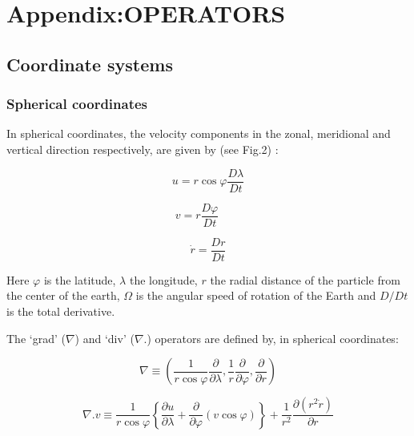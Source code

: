 
\section{Appendix:OPERATORS}

\subsection{Coordinate systems}

\subsubsection{Spherical coordinates}

In spherical coordinates, the velocity components in the zonal, meridional
and vertical direction respectively, are given by (see Fig.2) :

\begin{equation*}
u=r\cos \varphi \frac{D\lambda }{Dt}
\end{equation*}

\begin{equation*}
v=r\frac{D\varphi }{Dt}\qquad
\end{equation*}
$\qquad \qquad \qquad \qquad $

\begin{equation*}
\dot{r}=\frac{Dr}{Dt}
\end{equation*}

Here $\varphi $ is the latitude, $\lambda $ the longitude, $r$ the radial
distance of the particle from the center of the earth, $\Omega $ is the
angular speed of rotation of the Earth and $D/Dt$ is the total derivative.

The `grad' ($\nabla $) and `div' ($\nabla $.) operators are defined by, in
spherical coordinates:

\begin{equation*}
\nabla \equiv \left( \frac{1}{r\cos \varphi }\frac{\partial }{\partial \lambda }
,\frac{1}{r}\frac{\partial }{\partial \varphi },\frac{\partial }{\partial r}
\right)
\end{equation*}

\begin{equation*}
\nabla .v\equiv \frac{1}{r\cos \varphi }\left\{ \frac{\partial u}{\partial
\lambda }+\frac{\partial }{\partial \varphi }\left( v\cos \varphi \right) \right\}
+\frac{1}{r^{2}}\frac{\partial \left( r^{2}\dot{r}\right) }{\partial r}
\end{equation*}

